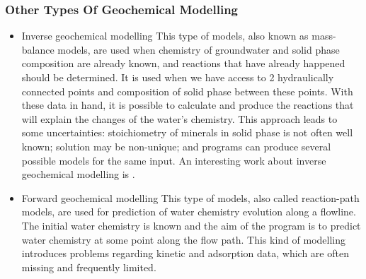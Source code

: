 \documentclass[ppgc,mestrado,English]{iiufrgs}
\begin{document}
\subsubsection{Other Types Of Geochemical Modelling}
\begin{itemize}
There are other types of geochemical equilibrium models, as mentioned before. For the sake of completeness, we summarize their characteristics below. 
\item Inverse geochemical modelling
This type of models, also known as mass-balance models, are used when chemistry of groundwater and solid phase composition are already known, and reactions that have already happened should be determined. It is used when we have access to 2 hydraulically connected points and composition of solid phase between these points. With these data in hand, it is possible to calculate and produce the reactions that will explain the changes of the water's chemistry. This approach leads to some uncertainties: stoichiometry of minerals in solid phase is not often well known; solution may be non-unique; and programs can produce several possible models for the same input. An interesting work about inverse geochemical modelling is \cite{Sharif:07}.

\item Forward geochemical modelling
This type of models, also called reaction-path models, are used for prediction of water chemistry evolution along a flowline. The initial water chemistry is known and the aim of the program is to predict water chemistry at some point along the flow path. This kind of modelling introduces problems regarding kinetic and adsorption data, which are often missing and frequently limited.
\end{itemize}

\newpage

\end{document}
